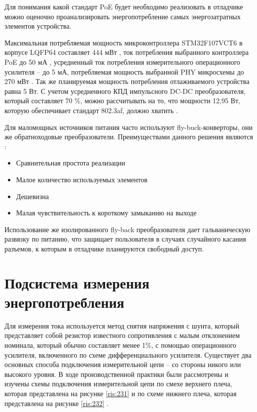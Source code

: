 Для понимания какой стандарт PoE будет необходимо реализовать в отладчике
можно оценочно проанализировать энергопотребление самых энергозатратных элементов устройства.

Максимальная потребляемая мощность микроконтроллера STM32F107VCT6 в корпусе LQFP64 составляет 
444 мВт \cite{STM32:datasheet}, ток потребления выбранного контроллера PoE до 50 мА 
\cite{TPS2376:datasheet}, усредненный ток потребления измерительного операционного усилителя --
до 5 мА, потребляемая мощность выбранной PHY микросхемы до 270 мВт \cite{DP83848:datasheet}. Так же
планируемая мощность потребления отлаживаемого устройства равна 5 Вт.
С учетом усредненного КПД импульсного DC-DC преобразователя, который составляет 70 \%, можно
рассчитывать на то, что мощности 12,95 Вт, которую обеспечивает стандарт 802.3af, должно хватить 
\cite{IEEE 802.3af}.

Для маломощных источников питания часто используют fly-buck-конверторы, они же обратноходовые
преобразователи. Преимуществами данного решения являются \cite{PowerElectronic:FlyBack}:
\begin{itemize}
  \item Сравнительная простота реализации
  \item Малое количество используемых элементов
  \item Дешевизна
  \item Малая чувствительность к короткому замыканию на выходе
\end{itemize}

Использование же изолированного fly-back преобразователя дает гальваническую развязку по питанию,
что защищает пользователя в случаях случайного касания разъемов, к которым в отладчике 
планируются свободный доступ.

\section{Подсистема измерения энергопотребления}
\hspace{1cm} 

Для измерения тока используется метод снятия напряжения с шунта,
 который представляет собой резистор известного сопротивления с малым отклонением номинала,
 который обычно составляет менее 1\%, с помощью операционного
усилителя, включенного по схеме дифференциального усилителя.
Существует два основных способа подключения измерительной цепи – со стороны никого
или высокого уровня. В ходе производственной практики были рассмотрены и изучены схемы
подключения измерительной цепи по смехе верхнего плеча, которая представлена на рисунке
\ref{ris:231} и по схеме нижнего плеча, которая представлена на рисунке \ref{ris:232} 
\cite{CurrentMeasSolution}.


